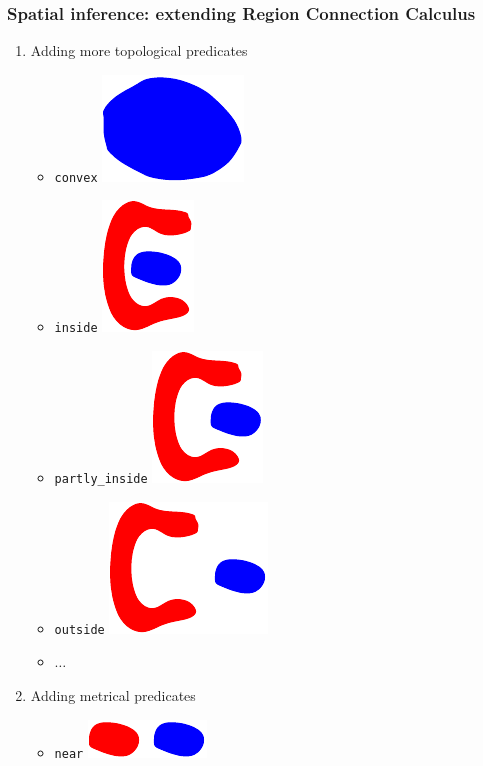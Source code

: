 \documentclass{beamer}
\begin{document}
\frame
{
  \frametitle{Spatial inference: extending Region Connection Calculus}

  \begin{enumerate}
  \item<+-> Adding \alert{more topological predicates}
    \begin{itemize}
    \item {\tt convex} \includegraphics[scale=0.3]{convex.pdf}
    \item {\tt inside} \includegraphics[scale=0.3]{inside.pdf}
    \item {\tt partly\_inside} \includegraphics[scale=0.3]{partly_inside.pdf}
    \item {\tt outside} \includegraphics[scale=0.3]{outside.pdf}
    \item $\ldots$
    \end{itemize}
  \item<+-> Adding \alert{metrical predicates}
    \begin{itemize}
    \item {\tt near} \includegraphics[scale=0.4]{near.pdf}

\end{itemize}
\end{enumerate}}
\end{document}
